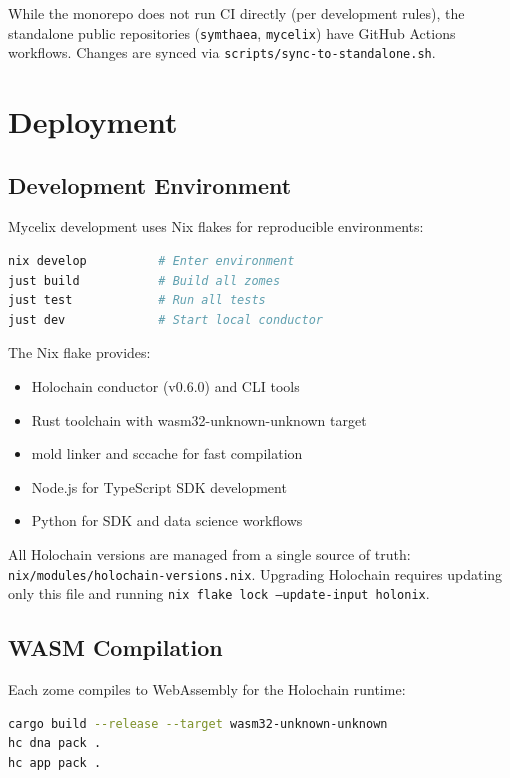 \documentclass[12pt]{book}
\begin{document}
While the monorepo does not run CI directly (per development rules), the
standalone public repositories (\texttt{symthaea}, \texttt{mycelix}) have
GitHub Actions workflows. Changes are synced via
\texttt{scripts/sync-to-standalone.sh}.


\chapter{Deployment}

\section{Development Environment}

Mycelix development uses Nix flakes for reproducible environments:

\begin{lstlisting}[language=bash,caption={Development setup}]
nix develop          # Enter environment
just build           # Build all zomes
just test            # Run all tests
just dev             # Start local conductor
\end{lstlisting}

The Nix flake provides:
\begin{itemize}
  \item Holochain conductor (v0.6.0) and CLI tools
  \item Rust toolchain with wasm32-unknown-unknown target
  \item mold linker and sccache for fast compilation
  \item Node.js for TypeScript SDK development
  \item Python for SDK and data science workflows
\end{itemize}

All Holochain versions are managed from a single source of truth:
\texttt{nix/modules/holochain-versions.nix}. Upgrading Holochain requires
updating only this file and running \texttt{nix flake lock --update-input holonix}.

\section{WASM Compilation}

Each zome compiles to WebAssembly for the Holochain runtime:

\begin{lstlisting}[language=bash]
cargo build --release --target wasm32-unknown-unknown
hc dna pack .
hc app pack .
\end{lstlisting}
\end{document}
